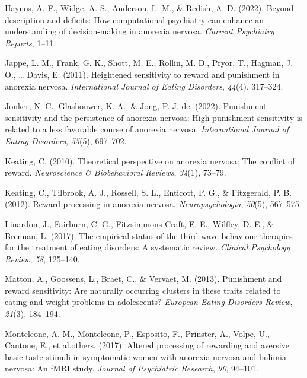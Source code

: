 \documentclass[
  man,floatsintext]{apa6}
\newlength{\cslhangindent}
\newlength{\cslentryspacingunit} %
\newenvironment{CSLReferences}[2] %
 {%
  \setlength{\parindent}{0pt}
  \ifodd #1
  \let\oldpar\par
  \def\par{\hangindent=\cslhangindent\oldpar}
  \fi
  \setlength{\parskip}{#2\cslentryspacingunit}
 }%
 {}
\begin{document}
\begin{CSLReferences}{1}{0}
\leavevmode{}%
Haynos, A. F., Widge, A. S., Anderson, L. M., \& Redish, A. D. (2022). Beyond description and deficits: How computational psychiatry can enhance an understanding of decision-making in anorexia nervosa. \emph{Current Psychiatry Reports}, 1--11.

\leavevmode{}%
Jappe, L. M., Frank, G. K., Shott, M. E., Rollin, M. D., Pryor, T., Hagman, J. O., \ldots{} Davis, E. (2011). Heightened sensitivity to reward and punishment in anorexia nervosa. \emph{International Journal of Eating Disorders}, \emph{44}(4), 317--324.

\leavevmode{}%
Jonker, N. C., Glashouwer, K. A., \& Jong, P. J. de. (2022). Punishment sensitivity and the persistence of anorexia nervosa: High punishment sensitivity is related to a less favorable course of anorexia nervosa. \emph{International Journal of Eating Disorders}, \emph{55}(5), 697--702.

\leavevmode{}%
Keating, C. (2010). Theoretical perspective on anorexia nervosa: The conflict of reward. \emph{Neuroscience \& Biobehavioral Reviews}, \emph{34}(1), 73--79.

\leavevmode{}%
Keating, C., Tilbrook, A. J., Rossell, S. L., Enticott, P. G., \& Fitzgerald, P. B. (2012). Reward processing in anorexia nervosa. \emph{Neuropsychologia}, \emph{50}(5), 567--575.

\leavevmode{}%
Linardon, J., Fairburn, C. G., Fitzsimmons-Craft, E. E., Wilfley, D. E., \& Brennan, L. (2017). The empirical status of the third-wave behaviour therapies for the treatment of eating disorders: A systematic review. \emph{Clinical Psychology Review}, \emph{58}, 125--140.

\leavevmode{}%
Matton, A., Goossens, L., Braet, C., \& Vervaet, M. (2013). Punishment and reward sensitivity: Are naturally occurring clusters in these traits related to eating and weight problems in adolescents? \emph{European Eating Disorders Review}, \emph{21}(3), 184--194.

\leavevmode{}%
Monteleone, A. M., Monteleone, P., Esposito, F., Prinster, A., Volpe, U., Cantone, E., et al.others. (2017). Altered processing of rewarding and aversive basic taste stimuli in symptomatic women with anorexia nervosa and bulimia nervosa: An fMRI study. \emph{Journal of Psychiatric Research}, \emph{90}, 94--101.


\end{CSLReferences}
\end{document}

